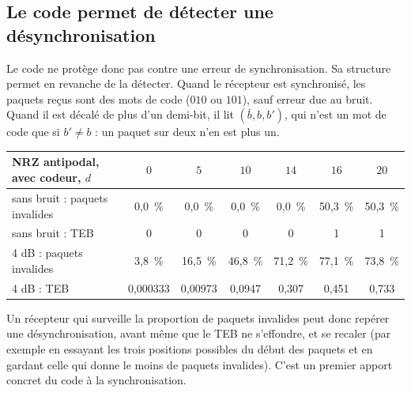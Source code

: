 \documentclass[11pt,a4paper]{article}
\begin{document}
\subsection{Le code permet de détecter une désynchronisation}
Le code ne protège donc pas contre une erreur de synchronisation. Sa structure permet en revanche de la détecter. Quand le récepteur est synchronisé, les paquets reçus sont des mots de code ($010$ ou $101$), sauf erreur due au bruit. Quand il est décalé de plus d'un demi-bit, il lit $(\bar b, b, b')$, qui n'est un mot de code que si $b' \ne b$ : un paquet sur deux n'en est plus un.
\begin{center}\footnotesize\begin{tabular}{lcccccc}\toprule
NRZ antipodal, avec codeur, $d$ & $0$ & $5$ & $10$ & $14$ & $16$ & $20$\\\midrule
sans bruit : paquets invalides & 0,0~\% & 0,0~\% & 0,0~\% & 0,0~\% & 50,3~\% & 50,3~\%\\
sans bruit : TEB & 0 & 0 & 0 & 0 & 1 & 1\\\midrule
4 dB : paquets invalides & 3,8~\% & 16,5~\% & 46,8~\% & 71,2~\% & 77,1~\% & 73,8~\%\\
4 dB : TEB & 0,000333 & 0,00973 & 0,0947 & 0,307 & 0,451 & 0,733\\
\bottomrule\end{tabular}\end{center}
Un récepteur qui surveille la proportion de paquets invalides peut donc repérer une désynchronisation, avant même que le TEB ne s'effondre, et se recaler (par exemple en essayant les trois positions possibles du début des paquets et en gardant celle qui donne le moins de paquets invalides). C'est un premier apport concret du code à la synchronisation.
\end{document}
